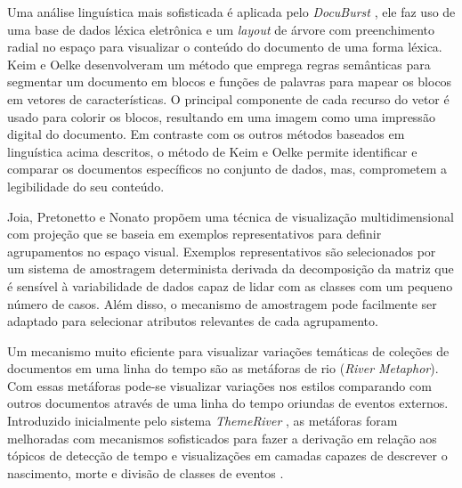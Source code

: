 Uma análise linguística mais sofisticada é aplicada pelo \textit{DocuBurst} \cite{collins2009docuburst}, ele faz uso de uma base de dados léxica eletrônica e um \textit{layout} de árvore com preenchimento radial no espaço para visualizar o conteúdo do documento de uma forma léxica. Keim e Oelke \cite{keim2007literature} desenvolveram um método que emprega regras semânticas para segmentar um documento em blocos e funções de palavras para mapear os blocos em vetores de características. O principal componente de cada recurso do vetor é usado para colorir os blocos, resultando em uma imagem como uma impressão digital do documento. Em contraste com os outros métodos  baseados em linguística acima descritos, o método de Keim e Oelke \cite{keim2007literature} permite identificar e comparar os documentos específicos no conjunto de dados, mas, comprometem a legibilidade do seu conteúdo.


Joia, Pretonetto e Nonato \cite{joia2015uncovering} propõem uma técnica de visualização multidimensional com projeção que se baseia em exemplos representativos para definir agrupamentos no espaço visual. Exemplos representativos são selecionados por um sistema de amostragem determinista derivada da decomposição da matriz que é sensível à variabilidade de dados capaz de lidar com as classes com um pequeno número de casos. Além disso, o mecanismo de amostragem pode facilmente ser adaptado para selecionar atributos relevantes de cada agrupamento.

Um mecanismo muito eficiente para visualizar variações temáticas de coleções de documentos em uma linha do tempo são as metáforas de rio (\textit{River Metaphor}). Com essas metáforas pode-se visualizar variações nos estilos comparando com outros documentos através de uma linha do tempo oriundas de eventos externos. Introduzido inicialmente pelo sistema \textit{ThemeRiver} \cite{havre2002themeriver}, as metáforas foram melhoradas com mecanismos sofisticados para fazer a derivação em relação aos tópicos de detecção de tempo \cite{liu2012tiara} e visualizações em camadas capazes de descrever o nascimento, morte e divisão de classes de eventos \cite{cui2011textflow}. 

